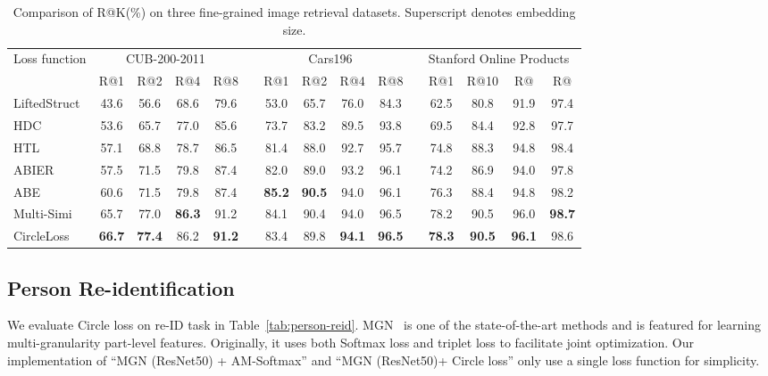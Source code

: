 \documentclass[10pt,twocolumn,letterpaper]{article}
\begin{document}
\begin{table*}[t]
    \small
    \centering
\caption{Comparison of R@K(\%) on three fine-grained image retrieval datasets. Superscript denotes embedding size.}
    \label{tab:cub-cars}
    \begin{tabularx}{\textwidth}{Xcccccccccccccc}
    \toprule
     \multirow{2}{*}{Loss function} & \multicolumn{4}{c}{CUB-200-2011~\cite{WahCUB_200_2011}} && \multicolumn{4}{c}{Cars196~\cite{krause20133d}} && \multicolumn{4}{c}{Stanford Online Products~\cite{oh2016deep}}\\
     \cmidrule{2-5} \cmidrule{7-10} \cmidrule{12-15}
  & R@1 & R@2 & R@4 & R@8 &  & R@1 & R@2 & R@4 & R@8 &  & R@1 &R@10& R@ & R@\\
     \midrule
     
    LiftedStruct~\cite{oh2016deep}      &43.6 &56.6&68.6&79.6  &&53.0&65.7&76.0&84.3  &&62.5&80.8&91.9&97.4 \\
HDC~\cite{Song_2017_CVPRHDC}              &53.6 &65.7&77.0&85.6  &&73.7&83.2&89.5&93.8  &&69.5&84.4&92.8&97.7\\
HTL~\cite{Ge_2018_ECCVHTL}               &57.1 &68.8&78.7&86.5  &&81.4&88.0&92.7&95.7  &&74.8&88.3&94.8&98.4\\
    ABIER~\cite{ABIER}   &57.5 &71.5&79.8&87.4  &&82.0&89.0&93.2&96.1  &&74.2&86.9&94.0&97.8\\
    ABE~\cite{Kim_2018_ECCVABE}    &60.6 &71.5&79.8&87.4  &&\textbf{85.2}&\textbf{90.5}&94.0&96.1  &&76.3&88.4&94.8&98.2\\ 
Multi-Simi~\cite{wang2019multi} & 65.7 & 77.0 & \textbf{86.3} & 91.2 &&   {84.1} & {90.4} & 94.0 & 96.5 && 78.2 & 90.5 & 96.0 & \textbf{98.7}\\
    CircleLoss                 & \textbf{66.7} & \textbf{77.4} & 86.2 & \textbf{91.2} &&   83.4 & 89.8 & \textbf{94.1} & \textbf{96.5} && \textbf{78.3} & \textbf{90.5} & \textbf{96.1} & 98.6 \\
    
    
    \bottomrule
    \end{tabularx}
\end{table*}


\subsection{Person Re-identification}\label{sec:exp_reid}

We evaluate Circle loss on re-ID task in Table~\ref{tab:person-reid}. MGN~\cite{Wang_2018MGN} is one of the state-of-the-art methods and is featured for learning multi-granularity part-level features. Originally, it uses both Softmax loss and triplet loss to facilitate joint optimization. Our implementation of ``MGN (ResNet50) + AM-Softmax'' and ``MGN (ResNet50)+ Circle loss'' only use a single loss function for simplicity. 
\end{document}
